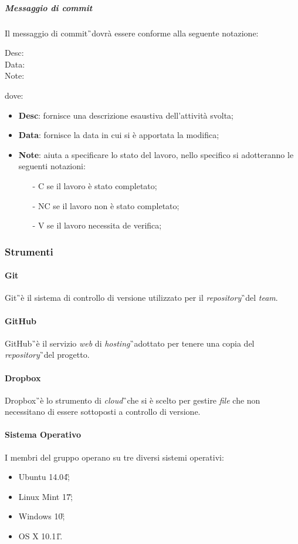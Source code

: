 \subparagraph{Messaggio di commit} Il messaggio di commit\G\ dovrà
essere conforme alla seguente notazione:
\begin{center}
Desc:\\
Data:\\
Note:\\
\end{center}
dove:
\begin{itemize}
\item \textbf{Desc}: fornisce una descrizione esaustiva dell’attività svolta;
\item \textbf{Data}: fornisce la data in cui si è apportata la modifica;
\item \textbf{Note}: aiuta a specificare lo stato del lavoro, nello specifico si adotteranno le seguenti notazioni:
\begin{itemize}
\item [-]{C} se il lavoro è stato completato;
\item [-]{NC} se il lavoro non è stato completato;
\item [-]{V} se il lavoro necessita de verifica;
\end{itemize}
\end{itemize}

\subsubsection{Strumenti}
\paragraph{Git} Git\G\ è il sistema di controllo di versione utilizzato per il \textit{repository}\G\ del \textit{team}.

\paragraph{GitHub} GitHub\G\ è il servizio \textit{web} di \textit{hosting}\G\ adottato per tenere una
copia del \textit{repository}\G\ del progetto.

\paragraph{Dropbox} Dropbox\G\ è lo strumento di \textit{cloud}\G\ che si è scelto
per gestire \textit{file} che non necessitano di essere sottoposti a controllo di versione.

\paragraph{Sistema Operativo} I membri del gruppo operano su tre diversi sistemi operativi:
\begin{itemize}
\item Ubuntu 14.04\G;
\item Linux Mint 17\G;
\item Windows 10\G;
\item OS X 10.11\G.
\end{itemize} 

